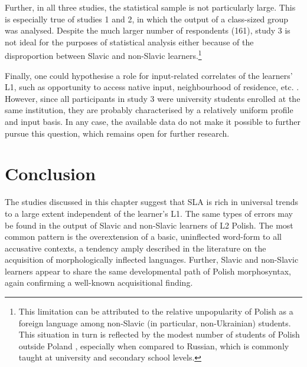 \documentclass[output=paper,            colorlinks, citecolor=brown            		  ]{langscibook}
\begin{document}
Further, in all three studies, the statistical sample is not particularly large. This is especially true of studies 1 and 2, in which the output of a class-sized group was analysed. Despite the much larger number of respondents (161), study 3 is not ideal for the purposes of statistical analysis either because of the disproportion between Slavic and non-Slavic learners.\footnote{{This limitation can be attributed to the relative unpopularity of Polish as a foreign language among non-Slavic (in particular, non-Ukrainian) students. This situation in turn is reflected by the modest number of students of Polish outside Poland} {\citep{MiodunkaEtAl2018}}{, especially when compared to Russian, which is commonly taught at university and secondary school levels.}}

Finally, one could hypothesise a role for input-related correlates of the learners’ L1, such as opportunity to access native input, neighbourhood of residence, etc. \citep{Flege2009}. However, since all participants in study 3 were university students enrolled at the same institution, they are probably characterised by a relatively uniform profile and input basis. In any case, the available data do not make it possible to further pursue this question, which remains open for further research.

\section{Conclusion}\label{sec:saturno:5}

The studies discussed in this chapter suggest that SLA is rich in universal trends to a large extent independent of the learner’s L1. The same types of errors may be found in the output of Slavic and non-Slavic learners of L2 Polish. The most common pattern is the overextension of a basic, uninflected word-form to all accusative contexts, a tendency amply described in the literature on the acquisition of morphologically inflected languages. Further, Slavic and non-Slavic learners appear to share the same developmental path of Polish morphosyntax, again confirming a well-known acquisitional finding. 
\end{document}
